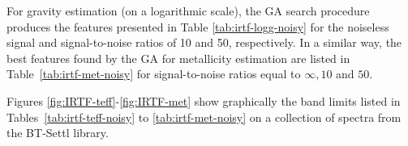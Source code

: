 For gravity estimation (on a logarithmic scale), the GA search
procedure produces the features presented in
Table %
\ref{tab:irtf-logg-noisy} for
the noiseless signal and signal-to-noise ratios of 10 and 50,
respectively. In a similar way, the best features found 
by the GA for metallicity estimation are listed in %
Table~\ref{tab:irtf-met-noisy} for signal-to-noise
ratios equal to $ \infty, 10 $ and $ 50 $.

Figures \ref{fig:IRTF-teff}-\ref{fig:IRTF-met} show
graphically the band limits listed in
Tables~\ref{tab:irtf-teff-noisy} to \ref{tab:irtf-met-noisy}
on a collection of spectra from the BT-Settl library.

